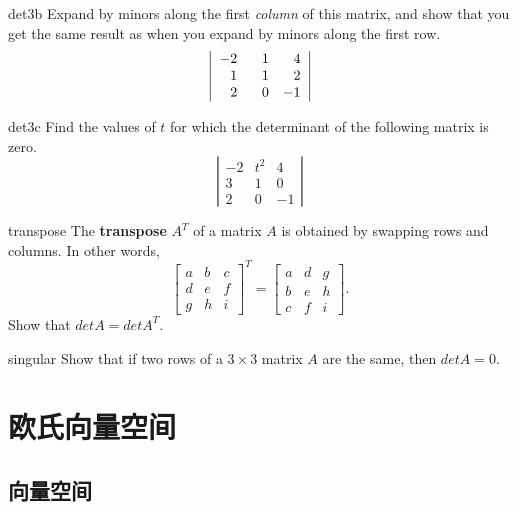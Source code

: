 \documentclass[indent]{watsonbook}
\begin{document}
{\begin{exercise}{}{det3b}
  Expand by minors along the first \textit{column} of this matrix, and
  show that you get the same result as when you expand by minors along
  the first row.
  \[
    \left|
      \begin{array}{ccc} -2 & \hphantom{-}1 & \hphantom{-}4 \\
        \hphantom{-}1 & \hphantom{-}1 & \hphantom{-}2 \\ \hphantom{-}2
                            & \hphantom{-}0 & -1
      \end{array}
    \right|
  \]
\end{exercise}

\begin{exercise}{}{det3c}
  Find the values of $t$ for which the determinant of the following matrix is zero.
  \[
    \left|\begin{array}{ccc} -2 & t^2 & 4 \\  3 & 1 & 0 \\ 2 & 0  & -1 \end{array}\right|
  \]
\end{exercise}

\begin{exercise}{}{transpose}
  The \textbf{transpose} $A^T$ of a matrix $A$ is obtained by swapping rows and
  columns. In other words,
  \[
    \left[
      \begin{array}{ccc} a & b & c
        \\ d & e & f
        \\ g & h &i
      \end{array}
    \right]^T
    =
    \left[
      \begin{array}{ccc}
        a & d & g\\ b & e & h \\ c & f & i
      \end{array}
    \right].
  \]
  Show  that ${d}et A = {d}et A^T$.
\end{exercise}

\begin{exercise}{}{singular}
  Show that if two rows of a $3 \times 3$ matrix $A$ are the same,
  then ${d}et A = 0$.
\end{exercise}

\chapter{欧氏向量空间}

\section{向量空间} \label{sec:vectors}

}
\end{document}
